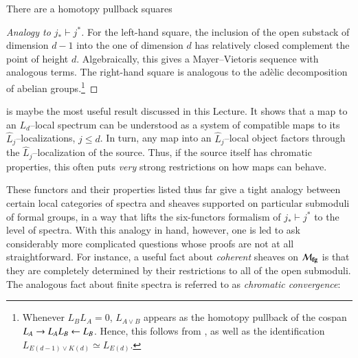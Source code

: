 \begin{corollary}\label{ChromaticFractureSquares}
There are a homotopy pullback squares
\begin{center}
\end{center}
\end{corollary}
\begin{proof}[Analogy to $j_* \vdash j^*$]
For the left-hand square, the inclusion of the open substack of dimension $d-1$ into the one of dimension $d$ has relatively closed complement the point of height $d$.  Algebraically, this gives a Mayer--Vietoris sequence with analogous terms.  The right-hand square is analogous to the ad\`elic decomposition of abelian groups.\footnote{Whenever $L_B L_A = 0$, $L_{A \vee B}$ appears as the homotopy pullback of the cospan $L_A \to L_A L_B \leftarrow L_B$.  Hence, this follows from , as well as the identification $L_{E(d-1) \vee K(d)} \simeq L_{E(d)}$.}
\end{proof}

\begin{remark}
 is maybe the most useful result discussed in this Lecture.  It shows that a map to an $L_d$--local spectrum can be understood as a system of compatible maps to its $\widehat L_j$--localizations, $j \le d$.  In turn, any map into an $\widehat L_j$--local object factors through the $\widehat L_j$--localization of the source.  Thus, if the source itself has chromatic properties, this often puts \emph{very} strong restrictions on how maps can behave.
\end{remark}

These functors and their properties listed thus far give a tight analogy between certain local categories of spectra and sheaves supported on particular submoduli of formal groups, in a way that lifts the six-functors formalism of $j_* \vdash j^*$ to the level of spectra.  With this analogy in hand, however, one is led to ask considerably more complicated questions whose proofs are not at all straightforward.  For instance, a useful fact about \emph{coherent} sheaves on $\mathcal{M}_{\mathbf{fg}}$ is that they are completely determined by their restrictions to all of the open submoduli.  The analogous fact about finite spectra is referred to as \textit{chromatic convergence}:

